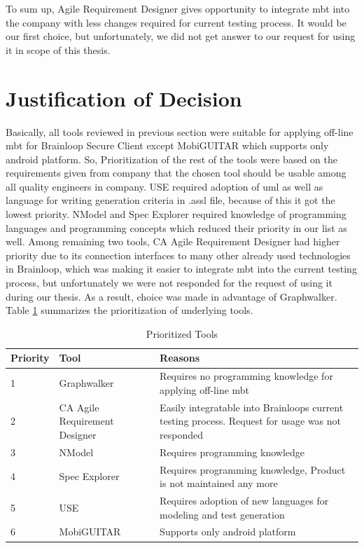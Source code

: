 \par
To sum up, Agile Requirement Designer gives opportunity to integrate \acrshort{mbt} into the company with less changes required for current testing process. It would be our first choice, but unfortunately, we did not get answer to our request for using it in scope of this thesis.

\section{Justification of Decision}

\par
Basically, all tools reviewed in previous section were suitable for applying off-line \acrshort{mbt} for Brainloop Secure Client except MobiGUITAR which supports only android platform. So, Prioritization of the rest of the tools were based on the requirements given from company that the chosen tool should be usable among all quality engineers in company. USE required adoption of \acrshort{uml} as well as language for writing generation criteria in .assl file, because of this it got the lowest priority. NModel and Spec Explorer required knowledge of programming languages and programming concepts which reduced their priority in our list as well. Among remaining two tools, CA Agile Requirement Designer had higher priority due to its connection interfaces to many other already used technologies in Brainloop, which was making it easier to integrate \acrshort{mbt} into the current testing process, but unfortunately we were not responded for the request of using it during our thesis. As a result, choice was made in advantage of Graphwalker. Table \ref{tab:Prioritized_Tools} summarizes the prioritization of underlying tools.

\begin{table}[]
    \centering
    \begin{tabular}{|l|l|p{8cm}|}
        \hline
        Priority & Tool & Reasons \\
        \hline
        1 & Graphwalker & Requires no programming knowledge for applying off-line \acrshort{mbt} \\
        \hline
        2 & CA Agile Requirement Designer & Easily integratable into Brainloops current testing process. Request for usage was not responded \\
        \hline
        3 & NModel & Requires programming knowledge \\
        \hline
        4 & Spec Explorer & Requires programming knowledge, Product is not maintained any more \\
        \hline
        5 & USE & Requires adoption of new languages for modeling and test generation\\
        \hline
        6 & MobiGUITAR & Supports only android platform \\
        \hline
    \end{tabular}
    \caption{Prioritized Tools}
    \label{tab:Prioritized_Tools}
\end{table}